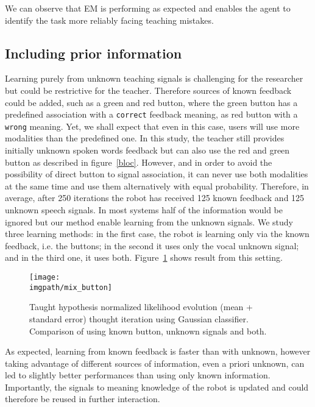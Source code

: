 We can observe that EM is performing as expected and enables the agent to identify the task more reliably facing teaching mistakes.

\subsection{Including prior information}
\label{sec:IncludingPriorInformation}

Learning purely from unknown teaching signals is challenging for the researcher but could be restrictive for the teacher. Therefore sources of known feedback could be added, such as a green and red button, where the green button has a predefined association with a \texttt{correct} feedback meaning, as red button with a \texttt{wrong} meaning. Yet, we shall expect that even in this case, users will use more modalities than the predefined one. 
%
In this study, the teacher still provides initially unknown spoken words feedback but can also use the red and green button as described in figure~\ref{bloc}. However, and in order to avoid the possibility of direct button to signal association, it can never use both modalities at the same time and use them alternatively with equal probability. 
%
Therefore, in average, after 250 iterations the robot has received 125 known feedback and 125 unknown speech signals. In most systems half of the information would be ignored but our method enable learning from the unknown signals. We study three learning methods: in the first case, the robot is learning only via the known feedback, i.e. the buttons; in the second it uses only the vocal unknown signal; and in the third one, it uses both.  Figure~\ref{fig:button} shows result from this setting. 

\begin{figure}[!htbp]
  \centering
  \texttt{[image: \\imgpath/mix\_button]}
  \caption{Taught hypothesis normalized likelihood evolution (mean + standard error) thought iteration using Gaussian classifier. Comparison of using known button, unknown signals and both.}
  \label{fig:button}
\end{figure}

As expected, learning from known feedback is faster than with unknown, however taking advantage of different sources of information, even a priori unknown, can led to slightly better performances than using only known information. Importantly, the signals to meaning knowledge of the robot is updated and could therefore be reused in further interaction.

